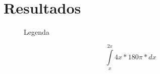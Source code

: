 \section{Resultados}
\lipsum[1]
\begin{figure}[h]
	\caption{Legenda}
	\label{fig:placeholder.jpg}
\end{figure}
\begin{center}
	\begin{equation}
	\int\limits_{x}^{2x} 4x*180\pi*dx
	\end{equation}
\end{center}